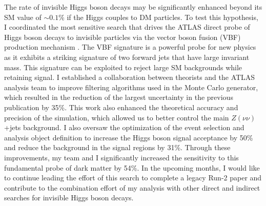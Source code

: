 \documentclass[a4paper]{article}
\begin{document}
The rate of invisible Higgs boson decays may be significantly enhanced beyond its SM value of $\sim0.1\%$ if the Higgs couples to DM particles.
To test this hypothesis, I coordinated the most sensitive search that drives the ATLAS direct probe of Higgs boson decays to invisible particles via the vector boson fusion (VBF) production mechanism \cite{vbfMET_CONF2020}. The VBF signature is a powerful probe for new physics as it exhibits a striking signature of two forward jets that have large invariant mass. This signature can be exploited to reject large SM backgrounds while retaining signal.
I established a collaboration between theorists and the ATLAS analysis team to improve
filtering algorithms used in the Monte Carlo generator, which resulted in the reduction of the largest uncertainty in the previous publication by 35\%. This work also enhanced the theoretical accuracy and precision of the simulation, which allowed us to better control the main $Z\left(\nu\nu\right)$+jets background.
I also oversaw the optimization of the event selection and analysis object definition to increase the Higgs boson signal acceptance by 50\% and reduce the background in the signal regions by 31\%. Through these improvements, my team and I significantly increased the sensitivity to this fundamental probe of dark matter by 54\%. In the upcoming months, I would like to continue leading the effort of this search to complete a
legacy Run-2 paper and contribute to the combination effort of my analysis with other direct and indirect searches for invisible Higgs boson decays.
\end{document}
